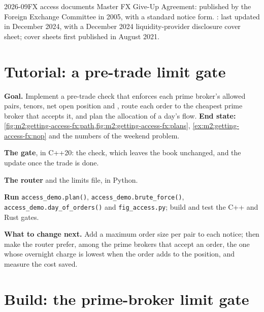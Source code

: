 \begin{dated}{2026-09}{FX access documents}\label{dat:m2:getting-access-fx:disclosure}
Master FX Give-Up Agreement: published by the Foreign Exchange Committee in 2005, with a
standard notice form. : last updated in December 2024, with a December
2024 liquidity-provider disclosure cover sheet; cover sheets first published in August
2021.
\end{dated}

\section{Tutorial: a pre-trade limit gate}\label{tut:m2:getting-access-fx:gate}

\begin{tutorial}
\textbf{Goal.} Implement a pre-trade check that enforces each prime broker's allowed
pairs, tenors, net open position and , route each order to the
cheapest prime broker that accepts it, and plan the allocation of a day's flow.
\textbf{End state:} \cref{fig:m2:getting-access-fx:path,fig:m2:getting-access-fx:plans},
\cref{ex:m2:getting-access-fx:nop} and the numbers of the weekend problem.
\begin{tutsteps}
\item \textbf{The gate}, in C++20: the check, which leaves the book unchanged, and the
update once the trade is done.
\label{lst:m2:getting-access-fx:gate}
\item \textbf{The router} and the limits file, in Python.
\label{lst:m2:getting-access-fx:route}
\item \textbf{Run} \texttt{access\_demo.plan()}, \texttt{access\_demo.brute\_force()},
\texttt{access\_demo.day\_of\_orders()} and \texttt{fig\_access.py}; build and test the
C++ and Rust gates.
\end{tutsteps}
\textbf{What to change next.} Add a maximum order size per pair to each notice; then
make the router prefer, among the prime brokers that accept an order, the one whose
overnight charge is lowest when the order adds to the position, and measure the cost
saved.
\end{tutorial}

\section{Build: the prime-broker limit gate}\label{bld:m2:getting-access-fx:pblimits}


